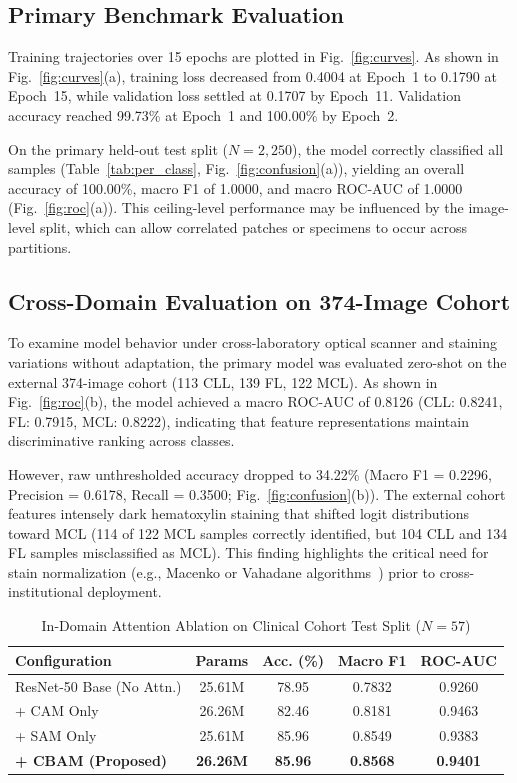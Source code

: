 \documentclass[conference]{IEEEtran}
\begin{document}
\subsection{Primary Benchmark Evaluation}
Training trajectories over 15 epochs are plotted in Fig.~\ref{fig:curves}. As shown in Fig.~\ref{fig:curves}(a), training loss decreased from 0.4004 at Epoch~1 to 0.1790 at Epoch~15, while validation loss settled at 0.1707 by Epoch~11. Validation accuracy reached 99.73\% at Epoch~1 and 100.00\% by Epoch~2.

On the primary held-out test split ($N=2,250$), the model correctly classified all samples (Table~\ref{tab:per_class}, Fig.~\ref{fig:confusion}(a)), yielding an overall accuracy of 100.00\%, macro F1 of 1.0000, and macro ROC-AUC of 1.0000 (Fig.~\ref{fig:roc}(a)). This ceiling-level performance may be influenced by the image-level split, which can allow correlated patches or specimens to occur across partitions.

\subsection{Cross-Domain Evaluation on 374-Image Cohort}
To examine model behavior under cross-laboratory optical scanner and staining variations without adaptation, the primary model was evaluated zero-shot on the external 374-image cohort (113 CLL, 139 FL, 122 MCL). As shown in Fig.~\ref{fig:roc}(b), the model achieved a macro ROC-AUC of 0.8126 (CLL: 0.8241, FL: 0.7915, MCL: 0.8222), indicating that feature representations maintain discriminative ranking across classes.

However, raw unthresholded accuracy dropped to 34.22\% (Macro F1 = 0.2296, Precision = 0.6178, Recall = 0.3500; Fig.~\ref{fig:confusion}(b)). The external cohort features intensely dark hematoxylin staining that shifted logit distributions toward MCL (114 of 122 MCL samples correctly identified, but 104 CLL and 134 FL samples misclassified as MCL). This finding highlights the critical need for stain normalization (e.g., Macenko or Vahadane algorithms~\cite{macenko2009method, vahadane2016structure}) prior to cross-institutional deployment.

\begin{table}[!t]
\centering
\caption{In-Domain Attention Ablation on Clinical Cohort Test Split ($N=57$)}
\label{tab:ablation}
\footnotesize
\setlength{\tabcolsep}{4pt}
\begin{tabular*}{\columnwidth}{@{\extracolsep{\fill}}lcccc}
\toprule
\textbf{Configuration} & \textbf{Params} & \textbf{Acc. (\%)} & \textbf{Macro F1} & \textbf{ROC-AUC} \\
\midrule
ResNet-50 Base (No Attn.) & 25.61M & 78.95 & 0.7832 & 0.9260 \\
+ CAM Only                & 26.26M & 82.46 & 0.8181 & 0.9463 \\
+ SAM Only                & 25.61M & 85.96 & 0.8549 & 0.9383 \\
\textbf{+ CBAM (Proposed)} & \textbf{26.26M} & \textbf{85.96} & \textbf{0.8568} & \textbf{0.9401} \\
\bottomrule
\end{tabular*}
\end{table}
\end{document}
